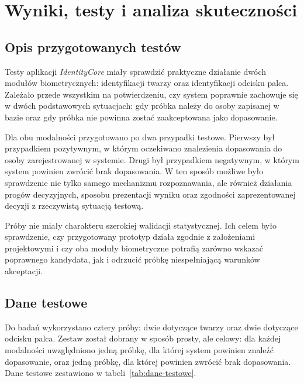 \chapter{Wyniki, testy i analiza skuteczności}
\label{chap:testy-analiza}

\section{Opis przygotowanych testów}

Testy aplikacji \textit{IdentityCore} miały sprawdzić praktyczne działanie dwóch modułów biometrycznych: identyfikacji twarzy oraz identyfikacji odcisku palca. Zależało przede wszystkim na potwierdzeniu, czy system poprawnie zachowuje się w dwóch podstawowych sytuacjach: gdy próbka należy do osoby zapisanej w bazie oraz gdy próbka nie powinna zostać zaakceptowana jako dopasowanie.

Dla obu modalności przygotowano po dwa przypadki testowe. Pierwszy był przypadkiem pozytywnym, w którym oczekiwano znalezienia dopasowania do osoby zarejestrowanej w systemie. Drugi był przypadkiem negatywnym, w którym system powinien zwrócić brak dopasowania. W ten sposób możliwe było sprawdzenie nie tylko samego mechanizmu rozpoznawania, ale również działania progów decyzyjnych, sposobu prezentacji wyniku oraz zgodności zaprezentowanej decyzji z rzeczywistą sytuacją testową.

Próby nie miały charakteru szerokiej walidacji statystycznej. Ich celem było sprawdzenie, czy przygotowany prototyp działa zgodnie z założeniami projektowymi i czy oba moduły biometryczne potrafią zarówno wskazać poprawnego kandydata, jak i odrzucić próbkę niespełniającą warunków akceptacji.

\section{Dane testowe}

Do badań wykorzystano cztery próby: dwie dotyczące twarzy oraz dwie dotyczące odcisku palca. Zestaw został dobrany w sposób prosty, ale celowy: dla każdej modalności uwzględniono jedną próbkę, dla której system powinien znaleźć dopasowanie, oraz jedną próbkę, dla której powinien zwrócić brak dopasowania. Dane testowe zestawiono w tabeli~\ref{tab:dane-testowe}.

